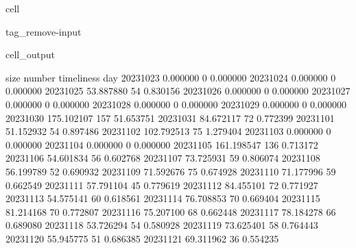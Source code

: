 \documentclass[letterpaper,10pt,english]{jupyterBook}
\begin{document}
\begin{sphinxuseclass}{cell}
\begin{sphinxuseclass}{tag_remove-input}\begin{sphinxVerbatimOutput}

\begin{sphinxuseclass}{cell_output}
\begin{sphinxVerbatim}[commandchars=\\\{\}]
                  size  number  timeliness
day                                       
2023\PYGZhy{}10\PYGZhy{}23    0.000000       0    0.000000
2023\PYGZhy{}10\PYGZhy{}24    0.000000       0    0.000000
2023\PYGZhy{}10\PYGZhy{}25   53.887880      54    0.830156
2023\PYGZhy{}10\PYGZhy{}26    0.000000       0    0.000000
2023\PYGZhy{}10\PYGZhy{}27    0.000000       0    0.000000
2023\PYGZhy{}10\PYGZhy{}28    0.000000       0    0.000000
2023\PYGZhy{}10\PYGZhy{}29    0.000000       0    0.000000
2023\PYGZhy{}10\PYGZhy{}30  175.102107     157   51.653751
2023\PYGZhy{}10\PYGZhy{}31   84.672117      72    0.772399
2023\PYGZhy{}11\PYGZhy{}01   51.152932      54    0.897486
2023\PYGZhy{}11\PYGZhy{}02  102.792513      75    1.279404
2023\PYGZhy{}11\PYGZhy{}03    0.000000       0    0.000000
2023\PYGZhy{}11\PYGZhy{}04    0.000000       0    0.000000
2023\PYGZhy{}11\PYGZhy{}05  161.198547     136    0.713172
2023\PYGZhy{}11\PYGZhy{}06   54.601834      56    0.602768
2023\PYGZhy{}11\PYGZhy{}07   73.725931      59    0.806074
2023\PYGZhy{}11\PYGZhy{}08   56.199789      52    0.690932
2023\PYGZhy{}11\PYGZhy{}09   71.592676      75    0.674928
2023\PYGZhy{}11\PYGZhy{}10   71.177996      59    0.662549
2023\PYGZhy{}11\PYGZhy{}11   57.791104      45    0.779619
2023\PYGZhy{}11\PYGZhy{}12   84.455101      72    0.771927
2023\PYGZhy{}11\PYGZhy{}13   54.575141      60    0.618561
2023\PYGZhy{}11\PYGZhy{}14   76.708853      70    0.669404
2023\PYGZhy{}11\PYGZhy{}15   81.214168      70    0.772807
2023\PYGZhy{}11\PYGZhy{}16   75.207100      68    0.662448
2023\PYGZhy{}11\PYGZhy{}17   78.184278      66    0.689080
2023\PYGZhy{}11\PYGZhy{}18   53.726294      54    0.580928
2023\PYGZhy{}11\PYGZhy{}19   73.625401      58    0.764443
2023\PYGZhy{}11\PYGZhy{}20   55.945775      51    0.686385
2023\PYGZhy{}11\PYGZhy{}21   69.311962      36    0.554235
\end{sphinxVerbatim}

\end{sphinxuseclass}\end{sphinxVerbatimOutput}

\end{sphinxuseclass}
\end{sphinxuseclass}
\sphinxstepscope
\end{document}
